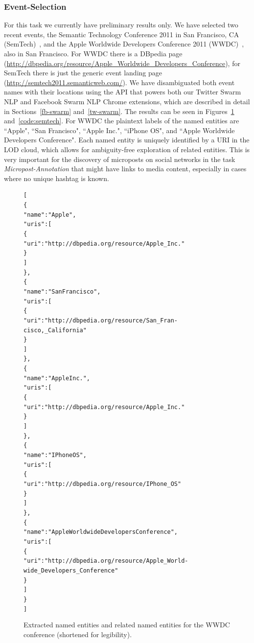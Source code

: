 \documentclass[12pt]{article}
\newenvironment{code}[1]
{\begin{lrbox}{\inverbatim}\begin{minipage}{13.5cm}\begin{alltt}{#1}}
{\end{alltt}\end{minipage}\end{lrbox}\colorbox{lightgray}{\usebox{\inverbatim}}}
\begin{document}
\subsubsection{Event-Selection}
For this task we currently have preliminary results only. We have selected two recent events, the Semantic Technology Conference 2011 in San Francisco, CA (SemTech)~\cite{semtech}, and the Apple Worldwide Developers Conference 2011 (WWDC)~\cite{wwdc}, also in San Francisco. For WWDC there is a DBpedia page (\url{http://dbpedia.org/resource/Apple_Worldwide_Developers_Conference}), for SemTech there is just the generic event landing page (\url{http://semtech2011.semanticweb.com/}). We have disambiguated both event names with their locations using the API that powers both our Twitter Swarm NLP and Facebook Swarm NLP Chrome extensions, which are described in detail in Sections~\ref{fb-swarm} and~\ref{tw-swarm}. The results can be seen in Figures~\ref{code:wwdc} and~\ref{code:semtech}. For WWDC the plaintext labels of the named entities are ``Apple", ``San Francisco", ``Apple Inc.", ``iPhone OS", and ``Apple Worldwide Developers Conference". Each named entity is uniquely identified by a URI in the LOD cloud, which allows for ambiguity-free exploration of related entities. This is very important for the discovery of microposts on social networks in the task \emph{Micropost-Annotation} that might have links to media content, especially in cases where no unique hashtag is known.

\begin{figure}[htbp!]
\begin{center}
{\footnotesize
\begin{code}
[
    \{
        "name": "Apple",
        "uris": [
            \{
                "uri": "http://dbpedia.org/resource/Apple_Inc."
            \}
        ]
    \},
    \{
        "name": "San Francisco",
        "uris": [
            \{
                "uri": "http://dbpedia.org/resource/San_Fran-
                        cisco,_California"         
            \}
        ]
    \},
    \{
        "name": "Apple Inc.",
        "uris": [
            \{
                "uri": "http://dbpedia.org/resource/Apple_Inc."         
            \}
        ]
    \},
    \{
        "name": "IPhone OS",
        "uris": [
            \{
                "uri": "http://dbpedia.org/resource/IPhone_OS"
            \}
        ]
    \},
    \{
        "name": "Apple Worldwide Developers Conference",
        "uris": [
            \{
                "uri": "http://dbpedia.org/resource/Apple_World-
                        wide_Developers_Conference"
            \}
        ]
    \}
]
\end{code}}
  \caption[Extracted named entities and related named entities for the WWDC conference.]{Extracted named entities and related named entities for the WWDC conference (shortened for legibility).}
  \label{code:wwdc} 
  \end{center}  
\end{figure}
\end{document}
